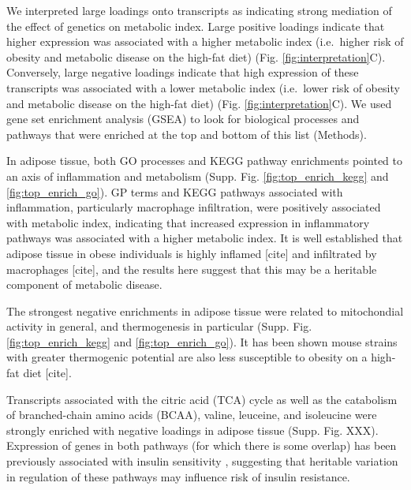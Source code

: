 \documentclass[
]{article}
\begin{document}
We interpreted large loadings onto transcripts as indicating strong
mediation of the effect of genetics on metabolic index. Large positive
loadings indicate that higher expression was associated with a higher
metabolic index (i.e.~higher risk of obesity and metabolic disease on
the high-fat diet) (Fig. \ref{fig:interpretation}C). Conversely, large
negative loadings indicate that high expression of these transcripts was
associated with a lower metabolic index (i.e.~lower risk of obesity and
metabolic disease on the high-fat diet) (Fig.
\ref{fig:interpretation}C). We used gene set enrichment analysis (GSEA)
\cite{fgsea, 
pmid16199517} to look for biological processes and pathways that were
enriched at the top and bottom of this list (Methods).

In adipose tissue, both GO processes and KEGG pathway enrichments
pointed to an axis of inflammation and metabolism (Supp. Fig.
\ref{fig:top_enrich_kegg} and \ref{fig:top_enrich_go}). GP terms and
KEGG pathways associated with inflammation, particularly macrophage
infiltration, were positively associated with metabolic index,
indicating that increased expression in inflammatory pathways was
associated with a higher metabolic index. It is well established that
adipose tissue in obese individuals is highly inflamed {[}cite{]} and
infiltrated by macrophages {[}cite{]}, and the results here suggest that
this may be a heritable component of metabolic disease.

The strongest negative enrichments in adipose tissue were related to
mitochondial activity in general, and thermogenesis in particular (Supp.
Fig. \ref{fig:top_enrich_kegg} and \ref{fig:top_enrich_go}). It has been
shown mouse strains with greater thermogenic potential are also less
susceptible to obesity on a high-fat diet {[}cite{]}.

Transcripts associated with the citric acid (TCA) cycle as well as the
catabolism of branched-chain amino acids (BCAA), valine, leuceine, and
isoleucine were strongly enriched with negative loadings in adipose
tissue (Supp. Fig. XXX). Expression of genes in both pathways (for which
there is some overlap) has been previously associated with insulin
sensitivity \cite{pmid29567659, 
pmid22560213, pmid19841271}, suggesting that heritable variation in
regulation of these pathways may influence risk of insulin resistance.
\end{document}
